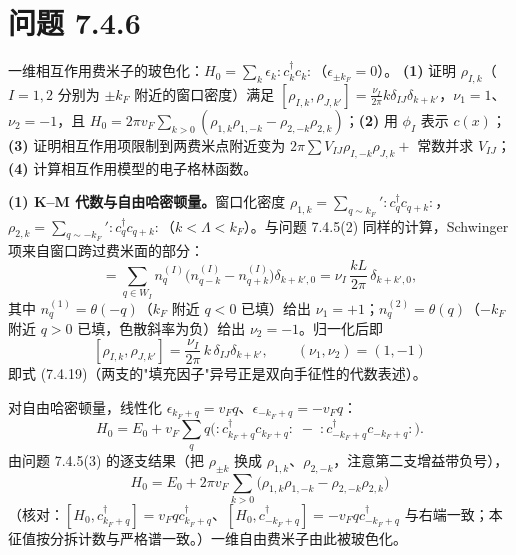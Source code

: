 \section*{问题 7.4.6}
\begin{problem}
一维相互作用费米子的玻色化：$H_0=\sum_k\epsilon_k\!:\!c_k^{\dagger}c_k\!:$（$\epsilon_{\pm k_F}=0$）。
\textbf{(1)} 证明 $\rho_{I,k}$（$I=1,2$ 分别为 $\pm k_F$ 附近的窗口密度）满足 $[\rho_{I,k},\rho_{J,k'}]=\frac{\nu_I}{2\pi}k\delta_{IJ}\delta_{k+k'}$，$\nu_1=1$、$\nu_2=-1$，且 $H_0=2\pi v_F\sum_{k>0}(\rho_{1,k}\rho_{1,-k}-\rho_{2,-k}\rho_{2,k})$；\textbf{(2)} 用 $\phi_I$ 表示 $c(x)$；\textbf{(3)} 证明相互作用项限制到两费米点附近变为 $2\pi\sum V_{IJ}\rho_{I,-k}\rho_{J,k}+$ 常数并求 $V_{IJ}$；\textbf{(4)} 计算相互作用模型的电子格林函数。
\end{problem}
\solution
\textbf{(1) K--M 代数与自由哈密顿量。}窗口化密度 $\rho_{1,k}=\sum_{q\sim k_F}\!'\!:\!c_q^{\dagger}c_{q+k}\!:$，$\rho_{2,k}=\sum_{q\sim-k_F}\!'\!:\!c_q^{\dagger}c_{q+k}\!:$（$k<\Lambda<k_F$）。与问题 7.4.5(2) 同样的计算，Schwinger 项来自窗口跨过费米面的部分：
\begin{equation*}
[\rho_{I,k},\rho_{I,k'}]=\sum_{q\in W_I}n_q^{(I)}\big(n^{(I)}_{q-k}-n^{(I)}_{q+k}\big)\delta_{k+k',0}
=\nu_I\,\frac{kL}{2\pi}\,\delta_{k+k',0},
\end{equation*}
其中 $n_q^{(1)}=\theta(-q)$（$k_F$ 附近 $q<0$ 已填）给出 $\nu_1=+1$；$n_q^{(2)}=\theta(q)$（$-k_F$ 附近 $q>0$ 已填，色散斜率为负）给出 $\nu_2=-1$。归一化后即
\begin{equation*}
\boxed{\;[\rho_{I,k},\rho_{J,k'}]=\frac{\nu_I}{2\pi}\,k\,\delta_{IJ}\delta_{k+k'},\qquad(\nu_1,\nu_2)=(1,-1)\;}
\end{equation*}
即式 (7.4.19)（两支的"填充因子"异号正是双向手征性的代数表述）。

对自由哈密顿量，线性化 $\epsilon_{k_F+q}=v_Fq$、$\epsilon_{-k_F+q}=-v_Fq$：
\begin{equation*}
H_0=E_0+v_F\!\sum_q\!q\big(\!:\!c_{k_F+q}^{\dagger}c_{k_F+q}\!:\;-\;:\!c_{-k_F+q}^{\dagger}c_{-k_F+q}\!:\big) .
\end{equation*}
由问题 7.4.5(3) 的逐支结果（把 $\rho_{\pm k}$ 换成 $\rho_{1,k}$、$\rho_{2,-k}$，注意第二支增益带负号），
\begin{equation*}
\boxed{\;H_0=E_0+2\pi v_F\sum_{k>0}\big(\rho_{1,k}\rho_{1,-k}-\rho_{2,-k}\rho_{2,k}\big)\;}
\end{equation*}
（核对：$[H_0,c_{k_F+q}^{\dagger}]=v_Fqc_{k_F+q}^{\dagger}$、$[H_0,c_{-k_F+q}^{\dagger}]=-v_Fqc_{-k_F+q}^{\dagger}$ 与右端一致；本征值按分拆计数与严格谱一致。）一维自由费米子由此被玻色化。

